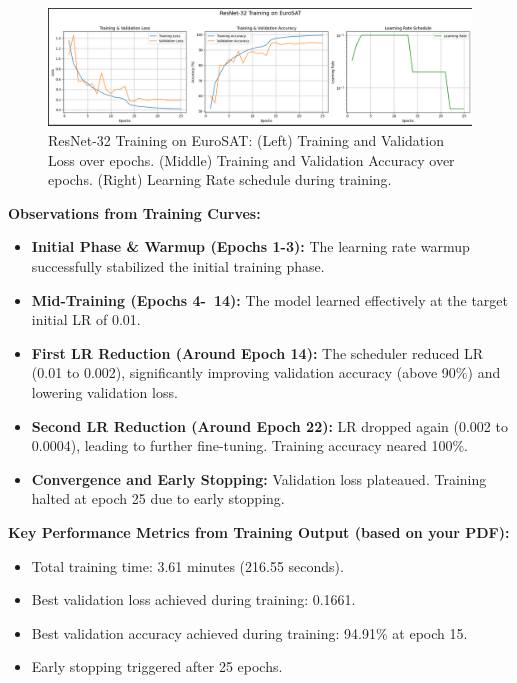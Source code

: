 \documentclass[11pt, a4paper]{article}
\begin{document}
\begin{figure}[H]
    \centering
    \includegraphics[width=\textwidth]{resnet32_eurosat_training_summary.png}
    \caption{ResNet-32 Training on EuroSAT: (Left) Training and Validation Loss over epochs. (Middle) Training and Validation Accuracy over epochs. (Right) Learning Rate schedule during training.}
    \label{fig:training_plots}
\end{figure}

\textbf{Observations from Training Curves:}
\begin{itemize}[itemsep=0.5em]
    \item \textbf{Initial Phase \& Warmup (Epochs 1-3):} The learning rate warmup successfully stabilized the initial training phase.
    \item \textbf{Mid-Training (Epochs 4-~14):} The model learned effectively at the target initial LR of 0.01.
    \item \textbf{First LR Reduction (Around Epoch 14):} The scheduler reduced LR (0.01 to 0.002), significantly improving validation accuracy (above 90\%) and lowering validation loss.
    \item \textbf{Second LR Reduction (Around Epoch 22):} LR dropped again (0.002 to 0.0004), leading to further fine-tuning. Training accuracy neared 100\%.
    \item \textbf{Convergence and Early Stopping:} Validation loss plateaued. Training halted at epoch 25 due to early stopping.
\end{itemize}

\textbf{Key Performance Metrics from Training Output (based on your PDF):}
\begin{itemize}[itemsep=0.3em]
    \item Total training time: 3.61 minutes (216.55 seconds).
    \item Best validation loss achieved during training: 0.1661.
    \item Best validation accuracy achieved during training: 94.91\% at epoch 15.
    \item Early stopping triggered after 25 epochs.
\end{itemize}
\end{document}
